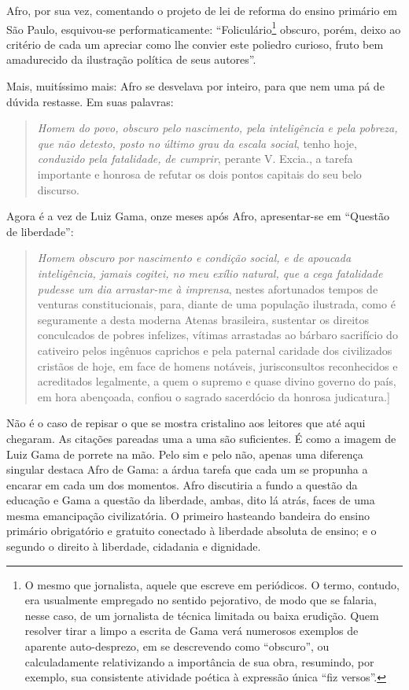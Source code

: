 Afro, por sua vez, comentando o projeto de lei de reforma do
ensino primário em São Paulo, esquivou-se performaticamente:
``Foliculário\footnote{O mesmo que jornalista, aquele que escreve em
  periódicos. O termo, contudo, era usualmente empregado no sentido
  pejorativo, de modo que se falaria, nesse caso, de um jornalista de
  técnica limitada ou baixa erudição. Quem resolver tirar a limpo a
  escrita de Gama verá numerosos exemplos de aparente auto-desprezo, em
  se descrevendo como ``obscuro'', ou calculadamente relativizando a
  importância de sua obra, resumindo, por exemplo, sua consistente
  atividade poética à expressão única ``fiz versos''.} obscuro, porém,
deixo ao critério de cada um apreciar como lhe convier este poliedro
curioso, fruto bem amadurecido da ilustração política de seus autores''.

Mais, muitíssimo mais: Afro se desvelava por inteiro, para que
nem uma pá de dúvida restasse. Em suas palavras:

\begin{quote}
\textit{Homem do povo, obscuro pelo nascimento, pela inteligência e
pela pobreza, que não detesto, posto no último grau da escala social},
tenho hoje, \textit{conduzido pela fatalidade, de cumprir}, perante V.
Excia., a tarefa importante e honrosa de refutar os dois pontos capitais
do seu belo discurso.
\end{quote}

Agora é a vez de Luiz Gama, onze meses após Afro, apresentar-se
em ``Questão de liberdade'':

\begin{quote}
\textit{Homem obscuro por nascimento e condição social, e de apoucada
inteligência, jamais cogitei, no meu exílio natural, que a cega
fatalidade pudesse um dia arrastar-me à imprensa}, nestes afortunados
tempos de venturas constitucionais, para, diante de uma população
ilustrada, como é seguramente a desta moderna Atenas brasileira,
sustentar os direitos conculcados de pobres infelizes, vítimas
arrastadas ao bárbaro sacrifício do cativeiro pelos ingênuos caprichos e
pela paternal caridade dos civilizados cristãos de hoje, em face de
homens notáveis, jurisconsultos reconhecidos e acreditados legalmente, a
quem o supremo e quase divino governo do país, em hora abençoada,
confiou o sagrado sacerdócio da honrosa judicatura.]
\end{quote}

Não é o caso de repisar o que se mostra cristalino aos leitores que até
aqui chegaram. As citações pareadas uma a uma são suficientes. É como a
imagem de Luiz Gama de porrete na mão. Pelo sim e pelo não, apenas uma
diferença singular destaca Afro de Gama: a árdua tarefa que cada
um se propunha a encarar em cada um dos momentos. Afro discutiria
a fundo a questão da educação e Gama a questão da liberdade, ambas, dito
lá atrás, faces de uma mesma emancipação civilizatória. O primeiro
hasteando bandeira do ensino primário obrigatório e gratuito conectado à
liberdade absoluta de ensino; e o segundo o direito à liberdade,
cidadania e dignidade.

